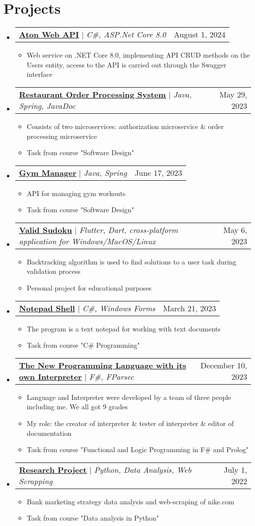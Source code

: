 \documentclass[letterpaper,11pt]{article}
\makeatletter
\newcommand{\resumeItem}[1]{
  \item\small{
    {#1 \vspace{-2pt}}
  }
}
\newcommand{\resumeProjectHeading}[2]{
    \item
    \begin{tabular*}{0.97\textwidth}{l@{\extracolsep{\fill}}r}
      \small#1 & #2 \\
    \end{tabular*}\vspace{-7pt}
}
\newcommand{\resumeSubHeadingListStart}{\begin{itemize}[leftmargin=0.15in, label={}]}
\newcommand{\resumeSubHeadingListEnd}{\end{itemize}}
\newcommand{\resumeItemListStart}{\begin{itemize}}
\newcommand{\resumeItemListEnd}{\end{itemize}\vspace{-5pt}}
\makeatother
\begin{document}
\section{Projects}
    \resumeSubHeadingListStart
          \resumeProjectHeading
          {\href{https://github.com/lkhorasandzhian/aton-web-api}{\underline{\textbf{Aton Web API}}} $|$ \emph{C\#, ASP.Net Core 8.0}}{August 1, 2024}
          \resumeItemListStart
            \resumeItem{Web service on .NET Core 8.0, implementing API CRUD methods on the Users entity, access to the API is carried out through the Swagger interface}
          \resumeItemListEnd
          \resumeProjectHeading
          {\href{https://github.com/lkhorasandzhian/restaurant-order-processing-system}{\underline{\textbf{Restaurant Order Processing System}}} $|$ \emph{Java, Spring, JavaDoc}}{May 29, 2023}
          \resumeItemListStart
            \resumeItem{Consists of two microservices: authorization microservice \& order processing microservice}
            \resumeItem{Task from course "Software Design"}
          \resumeItemListEnd
          \resumeProjectHeading
          {\href{https://github.com/lkhorasandzhian/kpo-gym}{\underline{\textbf{Gym Manager}}} $|$ \emph{Java, Spring}}{June 17, 2023}
          \resumeItemListStart
            \resumeItem{API for managing gym workouts}
            \resumeItem{Task from course "Software Design"}
          \resumeItemListEnd
          \resumeProjectHeading
          {\href{https://github.com/lkhorasandzhian/valid_sudoku}{\underline{\textbf{Valid Sudoku}}} $|$ \emph{Flutter, Dart, cross-platform application for Windows/MacOS/Linux}}{May 6, 2023}
          \resumeItemListStart
            \resumeItem{Backtracking algorithm is used to find solutions to a user task during validation process}
            \resumeItem{Personal project for educational purposes}
          \resumeItemListEnd
          \resumeProjectHeading
          {\href{https://github.com/lkhorasandzhian/notepad-shell}{\underline{\textbf{Notepad Shell}}} $|$ \emph{C\#, Windows Forms}}{March 21, 2023}
          \resumeItemListStart
            \resumeItem{The program is a text notepad for working with text documents}
            \resumeItem{Task from course "C\# Programming"}
          \resumeItemListEnd
          \resumeProjectHeading
          {\href{https://github.com/lkhorasandzhian/fp-compiler-lab-mosmetro}{\underline{\textbf{The New Programming Language with its own Interpreter}}} $|$ \emph{F\#, FParsec}}{December 10, 2023}
          \resumeItemListStart
            \resumeItem{Language and Interpreter were developed by a team of three people including me. We all got 9 grades}
            \resumeItem{My role: the creator of interpreter \& tester of interpreter \& editor of documentation}
            \resumeItem{Task from course "Functional and Logic Programming in F\# and Prolog"}
          \resumeItemListEnd
          \resumeProjectHeading
          {\href{https://github.com/lkhorasandzhian/research-project}{\underline{\textbf{Research Project}}} $|$ \emph{Python, Data Analysis, Web Scrapping}}{July 1, 2022}
          \resumeItemListStart
            \resumeItem{Bank marketing strategy data analysis and web-scraping of nike.com}
            \resumeItem{Task from course "Data analysis in Python"}
          \resumeItemListEnd
    \resumeSubHeadingListEnd
\end{document}
